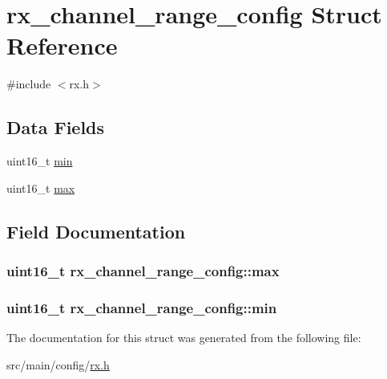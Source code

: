 \hypertarget{structrx__channel__range__config}{\section{rx\+\_\+channel\+\_\+range\+\_\+config Struct Reference}
\label{structrx__channel__range__config}
}


{\ttfamily \#include $<$rx.\+h$>$}

\subsection*{Data Fields}
\begin{DoxyCompactItemize}
\item 
uint16\+\_\+t \hyperlink{structrx__channel__range__config_ad6dd31064df4ea10efc89fc0b8942cdf}{min}
\item 
uint16\+\_\+t \hyperlink{structrx__channel__range__config_a4ce3543f8eac7031d3a8e9b40427f780}{max}
\end{DoxyCompactItemize}


\subsection{Field Documentation}
\hypertarget{structrx__channel__range__config_a4ce3543f8eac7031d3a8e9b40427f780}{
\subsubsection[{max}]{\setlength{\rightskip}{0pt plus 5cm}uint16\+\_\+t rx\+\_\+channel\+\_\+range\+\_\+config\+::max}}\label{structrx__channel__range__config_a4ce3543f8eac7031d3a8e9b40427f780}
\hypertarget{structrx__channel__range__config_ad6dd31064df4ea10efc89fc0b8942cdf}{
\subsubsection[{min}]{\setlength{\rightskip}{0pt plus 5cm}uint16\+\_\+t rx\+\_\+channel\+\_\+range\+\_\+config\+::min}}\label{structrx__channel__range__config_ad6dd31064df4ea10efc89fc0b8942cdf}


The documentation for this struct was generated from the following file\+:\begin{DoxyCompactItemize}
\item 
src/main/config/\hyperlink{config_2rx_8h}{rx.\+h}\end{DoxyCompactItemize}
